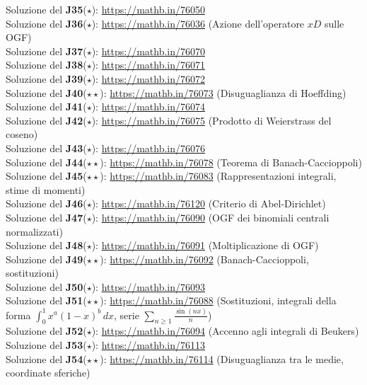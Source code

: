 \documentclass[a4paper,twoside]{article}
\theoremstyle{definition}
\numberwithin{theorem}{section}
\begin{document}
Soluzione del \textbf{J35}($\star$): \url{https://mathb.in/76050} \\
Soluzione del \textbf{J36}($\star$): \url{https://mathb.in/76036} (Azione dell'operatore $xD$ sulle OGF)\\
Soluzione del \textbf{J37}($\star$): \url{https://mathb.in/76070}\\
Soluzione del \textbf{J38}($\star$): \url{https://mathb.in/76071}\\
Soluzione del \textbf{J39}($\star$): \url{https://mathb.in/76072}\\
Soluzione del \textbf{J40}($\star\star$): \url{https://mathb.in/76073} (Disuguaglianza di Hoeffding)\\
Soluzione del \textbf{J41}($\star$): \url{https://mathb.in/76074}\\
Soluzione del \textbf{J42}($\star$): \url{https://mathb.in/76075} (Prodotto di Weierstrass del coseno)\\
Soluzione del \textbf{J43}($\star$): \url{https://mathb.in/76076}\\
Soluzione del \textbf{J44}($\star\star$): \url{https://mathb.in/76078} (Teorema di Banach-Caccioppoli)\\
Soluzione del \textbf{J45}($\star\star$): \url{https://mathb.in/76083} (Rappresentazioni integrali, stime di momenti)\\
Soluzione del \textbf{J46}($\star$): \url{https://mathb.in/76120} (Criterio di Abel-Dirichlet)\\
Soluzione del \textbf{J47}($\star$): \url{https://mathb.in/76090} (OGF dei binomiali centrali normalizzati)\\
Soluzione del \textbf{J48}($\star$): \url{https://mathb.in/76091} (Moltiplicazione di OGF)\\
Soluzione del \textbf{J49}($\star\star$): \url{https://mathb.in/76092} (Banach-Caccioppoli, sostituzioni) \\
Soluzione del \textbf{J50}($\star$): \url{https://mathb.in/76093} \\
Soluzione del \textbf{J51}($\star\star$): \url{https://mathb.in/76088} (Sostituzioni, integrali della forma $\int_{0}^{1}x^a(1-x)^b\,dx$, serie $\sum_{n\geq 1}\frac{\sin(nx)}{n}$)\\
Soluzione del \textbf{J52}($\star$): \url{https://mathb.in/76094} (Accenno agli integrali di Beukers)\\
Soluzione del \textbf{J53}($\star$): \url{https://mathb.in/76113} \\
Soluzione del \textbf{J54}($\star\star$): \url{https://mathb.in/76114} (Disuguaglianza tra le medie, coordinate sferiche)\\
\end{document}

